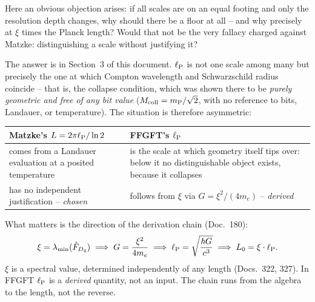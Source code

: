 Here an obvious objection arises: if all scales are on an equal footing
and only the resolution depth changes, why should there be a floor at
all -- and why precisely at $\xi$ times the Planck length? Would that not
be the very fallacy charged against Matzke: distinguishing a scale
without justifying it?

The answer is in Section~3 of this document. $\ell_{\mathrm{P}}$ is not one scale among
many but precisely the one at which Compton wavelength and Schwarzschild
radius coincide -- that is, the collapse condition, which was shown there
to be \emph{purely geometric and free of any bit value}
($M_{\mathrm{coll}} = m_{\mathrm{P}}/\sqrt{2}$, with no reference to bits, Landauer, or
temperature). The situation is therefore asymmetric:

\begin{center}
\small
\begin{tabular}{@{}p{5.2cm}p{8.3cm}@{}}
  \toprule
  \textbf{Matzke's} $L = 2\pi\ell_{\mathrm{P}}/\ln 2$ & \textbf{FFGFT's} $\ell_{\mathrm{P}}$ \\
  \midrule
  comes from a Landauer evaluation at a posited temperature &
  is the scale at which geometry itself tips over: below it no
  distinguishable object exists, because it collapses \\[3pt]
  has no independent justification -- \emph{chosen} &
  follows from $\xi$ via $G = \xi^2/(4m_e)$ -- \emph{derived} \\
  \bottomrule
\end{tabular}
\end{center}

What matters is the direction of the derivation chain (Doc.~180):
\begin{equation}
  \xi = \lambda_{\min}(\hat F_{D_4})
  \;\Longrightarrow\; G = \frac{\xi^2}{4m_e}
  \;\Longrightarrow\; \ell_{\mathrm{P}} = \sqrt{\frac{\hbar G}{c^3}}
  \;\Longrightarrow\; L_0 = \xi\cdot\ell_{\mathrm{P}} .
\end{equation}
$\xi$ is a spectral value, determined independently of any length
(Docs.~322, 327). In FFGFT $\ell_{\mathrm{P}}$ is a \emph{derived} quantity, not an
input. The chain runs from the algebra to the length, not the reverse.

